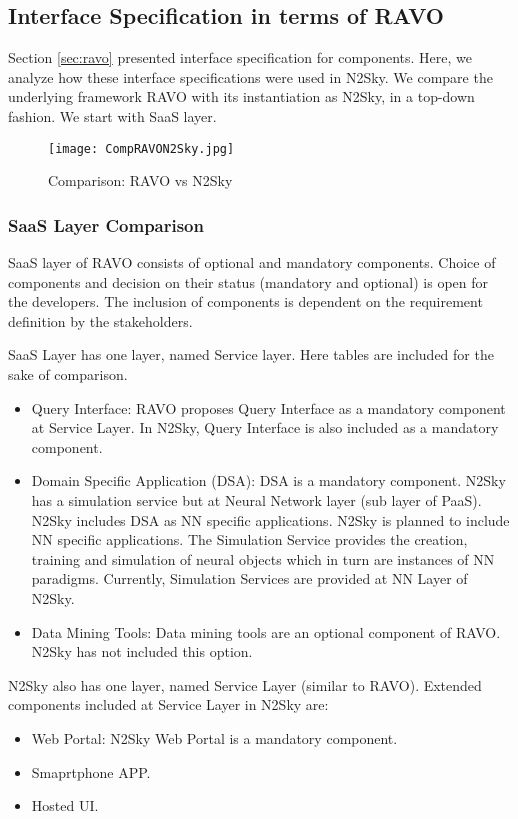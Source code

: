 \documentclass[]{article}
\begin{document}
\subsection{Interface Specification in terms of RAVO}

 Section \ref{sec:ravo} presented interface specification for components. Here, we analyze how these interface specifications were used in N2Sky. We compare the underlying framework RAVO with its instantiation as N2Sky, in a top-down fashion. We start with SaaS layer.

\begin{figure}
\begin{center}
  \texttt{[image: CompRAVON2Sky.jpg]}
  \caption{Comparison: RAVO vs N2Sky}
  \label{fig:comp}
  \end{center}
   \end{figure}


\subsubsection{SaaS Layer Comparison}
SaaS layer of RAVO consists of optional and mandatory components. Choice of components and decision on their status (mandatory and optional) is open for the developers. The inclusion of components is dependent on the requirement definition by the stakeholders.

SaaS Layer has one layer, named Service layer. Here tables are included for the sake of comparison.
\begin{itemize}
\item Query Interface: RAVO proposes Query Interface as a mandatory component at Service Layer. In N2Sky, Query Interface is also included as a mandatory component.
\item Domain Specific Application (DSA): DSA is a mandatory component. N2Sky has a simulation service but at Neural Network layer (sub layer of PaaS). N2Sky includes DSA as NN specific applications. N2Sky is planned to include NN specific applications. The Simulation Service provides the creation, training and simulation of neural objects which in turn are instances of NN paradigms. Currently, Simulation Services are provided at NN Layer of N2Sky.
\item Data Mining Tools: Data mining tools are an optional component of RAVO. N2Sky has not included this option.
    \end{itemize}


N2Sky also has one layer, named Service Layer (similar to RAVO). Extended components included at Service Layer in N2Sky are:
\begin{itemize}
\item Web Portal: N2Sky Web Portal is a mandatory component.
\item Smaprtphone APP.
\item Hosted UI.
\end{itemize}
\end{document}
